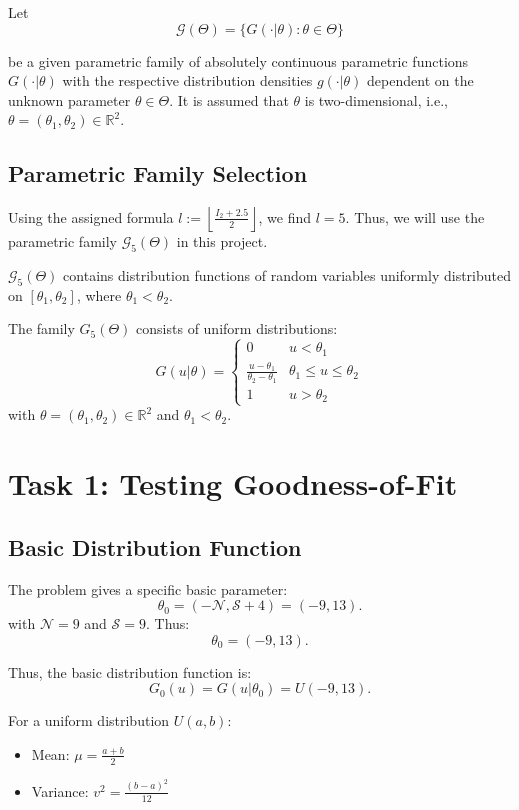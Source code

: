 \documentclass{article}
\begin{document}
Let
\[
\mathcal{G}(\Theta) = \{G(\cdot|\theta) : \theta \in \Theta\}
\]

be a given parametric family of absolutely continuous parametric functions \(G(\cdot|\theta)\) with the respective distribution densities \(g(\cdot|\theta)\) dependent on the unknown parameter \(\theta \in \Theta\). It is assumed that \(\theta\) is two-dimensional, i.e., \(\theta = (\theta_1, \theta_2) \in \mathbb{R}^2\).

\subsection{Parametric Family Selection}

Using the assigned formula $l := \left\lfloor \frac{I_2 + 2.5}{2} \right\rfloor$, we find $l = 5$. Thus, we will use the parametric family $\mathcal{G}_5(\Theta)$ in this project.

$\mathcal{G}_5(\Theta)$ contains distribution functions of random variables uniformly distributed on $[\theta_1, \theta_2]$, where $\theta_1 < \theta_2$.

The family \( G_5(\Theta) \) consists of uniform distributions:
\[
G(u|\theta) = \begin{cases}
0 & u < \theta_1 \\
\frac{u - \theta_1}{\theta_2 - \theta_1} & \theta_1 \le u \le \theta_2 \\
1 & u > \theta_2
\end{cases}
\]
with \(\theta = (\theta_1, \theta_2) \in \mathbb{R}^2\) and \(\theta_1 < \theta_2\).

\section{Task 1: Testing Goodness-of-Fit}

\subsection{Basic Distribution Function}

The problem gives a specific basic parameter:
\[
\theta_0 = (-\mathcal{N}, \mathcal{S} + 4) = (-9, 13).
\]
with \(\mathcal{N} = 9\) and \(\mathcal{S} = 9\). Thus:
\[
\theta_0 = (-9, 13).
\]

Thus, the basic distribution function is:
\[
G_0(u) = G(u|\theta_0) = U(-9, 13).
\]

For a uniform distribution \(U(a,b)\):

\begin{itemize}
    \item Mean: \(\mu = \frac{a+b}{2}\)
    \item Variance: \(v^2 = \frac{(b-a)^2}{12}\)
\end{itemize}
\end{document}
